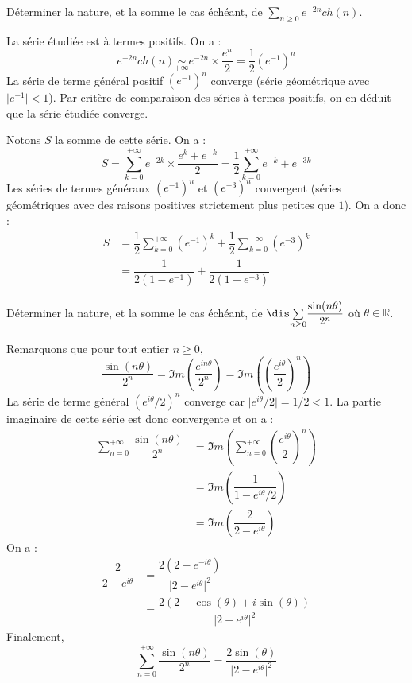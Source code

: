 \documentclass[a4paper,10pt]{report}
\newcommand{\Sum}[2]{\ensuremath{\textstyle{\sum\limits_{#1}^{#2}}}}
\begin{document}
\begin{Exa} Déterminer la nature, et la somme le cas échéant, de $\Sum{n \geq 0}{} e^{-2n} ch(n)$.
\end{Exa}

\corr La série étudiée est à termes positifs. On a :
$$ e^{-2n} ch(n) \underset{+ \infty}{\sim} e^{-2n} \times \dfrac{e^n}{2} = \dfrac{1}{2} (e^{-1})^n$$
La série de terme général positif $(e^{-1})^n$ converge (série géométrique avec $\vert e^{-1} \vert <1$). Par critère de comparaison des séries à termes positifs, on en déduit que la série étudiée converge. 

\medskip

\noindent Notons $S$ la somme de cette série. On a :
$$ S = \sum_{k=0}^{+ \infty} e^{-2k} \times \dfrac{e^k + e^{-k}}{2} = \dfrac{1}{2} \sum_{k=0}^{+ \infty} e^{-k} + e^{-3k}$$
Les séries de termes généraux $(e^{-1})^n$ et $(e^{-3})^n$ convergent (séries géométriques avec des raisons positives strictement plus petites que $1$). On a donc :
\begin{align*}
S & = \dfrac{1}{2} \sum_{k=0}^{+ \infty} (e^{-1})^k + \dfrac{1}{2} \sum_{k=0}^{+ \infty} (e^{-3})^k \\
& = \dfrac{1}{2(1-e^{-1})} + \dfrac{1}{2(1-e^{-3})}
\end{align*}

\begin{Exa} Déterminer la nature, et la somme le cas échéant, de $\dis \Sum{n \geq 0}{} \dfrac{\sin(n \theta)}{2^n}$ où $\theta \in \mathbb{R}$.
\end{Exa}

\corr Remarquons que pour tout entier $n \geq 0$,
$$ \dfrac{\sin(n \theta)}{2^n} = \Im m \left( \dfrac{e^{i n\theta}}{2^n} \right) = \Im m \left(\left( \dfrac{e^{i \theta}}{2} \right)^n \right)$$
La série de terme général $(e^{i \theta}/2)^n$ converge car $\vert e^{i \theta}/2 \vert = 1/2 <1$. La partie imaginaire de cette série est donc convergente et on a :
\begin{align*}
\sum_{n=0}^{+ \infty}  \dfrac{\sin(n \theta)}{2^n}  & = \Im m \left( \sum_{n=0}^{+ \infty} \left( \dfrac{e^{i \theta}}{2} \right)^n \right) \\
& = \Im m \left( \dfrac{1}{1-e^{i \theta}/2} \right) \\
& = \Im m \left( \dfrac{2}{2- e^{i \theta}} \right)
\end{align*}
On a :
\begin{align*}
\dfrac{2}{2- e^{i \theta}} & = \dfrac{2(2-e^{- i\theta})}{\vert 2- e^{i \theta} \vert^2} \\
& = \dfrac{2(2- \cos(\theta)+i \sin(\theta))}{\vert 2- e^{i \theta} \vert^2}
\end{align*}
Finalement,
$$ \sum_{n=0}^{+ \infty}  \dfrac{\sin(n \theta)}{2^n} = \dfrac{2\sin(\theta)}{\vert 2- e^{i \theta} \vert^2}$$
\end{document}
